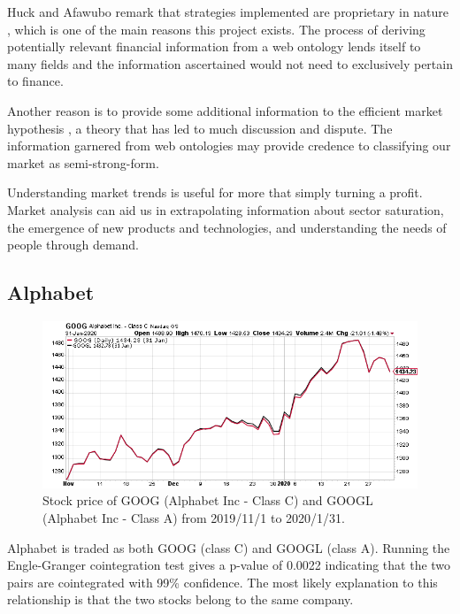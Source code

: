 \documentclass{UoYCSproject}
\begin{document}
Huck and Afawubo remark that strategies implemented are proprietary in nature \parencite{cointsupport}, which is one of the main reasons this project exists. The process of deriving potentially relevant financial information from a web ontology lends itself to many fields and the information ascertained would not need to exclusively pertain to finance.

Another reason is to provide some additional information to the efficient market hypothesis \parencite{efficientmarket}, a theory that has led to much discussion and dispute. The information garnered from web ontologies may provide credence to classifying our market as semi-strong-form.

Understanding market trends is useful for more that simply turning a profit. Market analysis can aid us in extrapolating information about sector saturation, the emergence of new products and technologies, and understanding the needs of people through demand.

\subsection{Alphabet}

\begin{figure}[h]
\begin{center}
\includegraphics[trim=0 0 0 15, clip, width=\linewidth]{"./images/GOOGGOOGL"}
\end{center}
\caption{Stock price of GOOG (Alphabet Inc - Class C) and GOOGL (Alphabet Inc - Class A) from 2019/11/1 to 2020/1/31.}
\end{figure}

Alphabet is traded as both GOOG (class C) and GOOGL (class A). Running the Engle-Granger cointegration test gives a p-value of 0.0022 indicating that the two pairs are cointegrated with 99\% confidence. The most likely explanation to this relationship is that the two stocks belong to the same company. 
\end{document}
